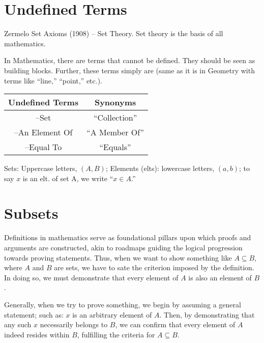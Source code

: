 \renewcommand{\theenumi}{\arabic{enumi}}
\renewcommand{\labelenumi}{\theenumi.}
\section{Undefined Terms}

Zermelo Set Axioms (1908) -- Set Theory. 
Set theory is the basis of all mathematics. 

In Mathematics, there are terms that cannot be defined. They should be seen as building blocks. Further, these terms simply are (same as it is in Geometry with terms like ``line,'' ``point,'' etc.).

\begin{center}
    \begin{tabular}{c|c}
        \textbf{Undefined Terms} & \textbf{Synonyms} \\
        \hline
        --Set                    & ``Collection''    \\
        \hline
        --An Element Of          & ``A Member Of''   \\
        \hline
        --Equal To               & ``Equals''        
    \end{tabular}
\end{center}



\begin{note}
    Sets: Uppercase letters, $(A, B)$;
    Elements (elts): lowercase letters, $(a, b)$;
    to say $x$ is an elt. of set A, we write ``$x \in A$.''
\end{note}

\pfs

\renewcommand{\theenumi}{\arabic{enumi}}
\renewcommand{\labelenumi}{\theenumi.}
\section{Subsets}

Definitions in mathematics serve as foundational pillars upon which proofs and arguments are constructed, akin to roadmaps guiding the logical progression towards proving statements. Thus, when we want to show something like \( A \subseteq B \), where \( A \) and \( B \) are sets, we have to sate the criterion imposed by the definition. In doing so, we must demonstrate that every element of \( A \) is also an element of \( B \).

Generally, when we try to prove something, we begin by assuming a general statement; such as: \( x \) is an arbitrary element of \( A \). Then, by demonstrating that any such \( x \) necessarily belongs to \( B \), we can confirm that every element of \( A \) indeed resides within \( B \), fulfilling the criteria for \( A \subseteq B \).

